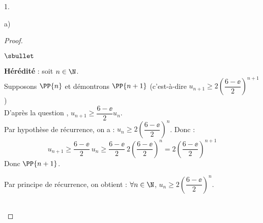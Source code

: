 \begin{noliste}{1.}
\begin{noliste}{a)}
\begin{proof}
\begin{remark}
\begin{noliste}{$\sbullet$}
\begin{noliste}{\fitem}
      \item {\bf Hérédité} : soit $n\in\N$.\\
        Supposons $\PP{n}$ et démontrons $\PP{n+1}$ (c'est-à-dire
        $u_{n+1}\geq 2 \left(\dfrac{6-\ee}{2}\right)^{n+1}$)\\
        D'après la question , $u_{n+1}\geq
        \dfrac{6-\ee}{2} u_n$.\\
        Par hypothèse de récurrence, on a : $u_n\geq 2
        \left(\dfrac{6-\ee}{2}\right)^n$. Donc :
        \[
        u_{n+1} \geq \dfrac{6-\ee}{2} \ u_n \geq 
        \dfrac{6-\ee}{2} \ 2 \left(\dfrac{6-\ee}{2}\right)^n = 
        2 \left(\dfrac{6-\ee}{2}\right)^{n+1}
        \]
        Donc $\PP{n+1}$.
      \end{noliste}
      Par principe de récurrence, on obtient : $\forall n\in\N$, 
      $u_n\geq 2 \left(\dfrac{6-\ee}{2}\right)^n$.
      
    \end{noliste}
  \end{remark}~\\[-1.4cm]
\end{proof}
\end{noliste}
\end{noliste}

